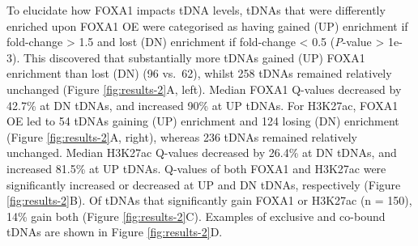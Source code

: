 \documentclass[
  12pt,
]{article}
\begin{document}
To elucidate how FOXA1 impacts tDNA levels, tDNAs that were differently enriched upon FOXA1 OE were categorised as having gained (UP) enrichment if fold-change \textgreater{} 1.5 and lost (DN) enrichment if fold-change \textless{} 0.5 (\emph{P}-value \textgreater{} 1e-3).
This discovered that substantially more tDNAs gained (UP) FOXA1 enrichment than lost (DN) (96 vs.~62), whilst 258 tDNAs remained relatively unchanged (Figure \ref{fig:results-2}A, left).
Median FOXA1 Q-values decreased by 42.7\% at DN tDNAs, and increased 90\% at UP tDNAs.
For H3K27ac, FOXA1 OE led to 54 tDNAs gaining (UP) enrichment and 124 losing (DN) enrichment (Figure \ref{fig:results-2}A, right), whereas 236 tDNAs remained relatively unchanged.
Median H3K27ac Q-values decreased by 26.4\% at DN tDNAs, and increased 81.5\% at UP tDNAs.
Q-values of both FOXA1 and H3K27ac were significantly increased or decreased at UP and DN tDNAs, respectively (Figure \ref{fig:results-2}B).
Of tDNAs that significantly gain FOXA1 or H3K27ac (n = 150), 14\% gain both (Figure \ref{fig:results-2}C).
Examples of exclusive and co-bound tDNAs are shown in Figure \ref{fig:results-2}D.
\end{document}
